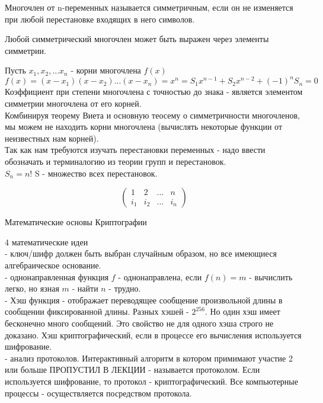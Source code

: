 \begin{defin}
	Многочлен от n-переменных называется симметричным, если он не изменяется при
 любой перестановке входящих в него символов.
\end{defin}

\begin{theorem}
	Любой симметрический многочлен может быть выражен через элементы симметрии.
\end{theorem}

\begin{theorem}[ Виета]
	Пусть $x_1, x_2, ... x_n$ - корни многочлена $f(x)$\\
	$f(x) = (x - x_1)(x - x_2) ... (x - x_n) = x^n = S_1 x^{n - 1} + S_2 x^{n - 2}
	+ (-1)^n S_n = 0$\\
	Коэффициент при степени многочлена с точностью до знака - является элементом
	симметрии многочлена от его корней.\\
	Комбинируя теорему Виета и основную теосему о симметричности многочленов, мы
	можем не находить корни многочлена (вычислять некоторые функции от неизвестных
	нам корней).\\
	Так как нам требуются изучать перестановки переменных - надо ввести обозначать
	и терминалогию из теории групп и перестановок.\\
	$S_n = n!$ S - множество всех перестановок.
\end{theorem}

\begin{displaymath}
\left( \begin{array}{lccr}
1 & 2 & ... & n \\
i_1 & i_2 & ... & i_n
\end{array}\right)
\end{displaymath}

\begin{title}
	Математические основы Криптографии
\end{title}

4 математические идеи\\

 - ключ/шифр должен быть выбран случайным образом, но все
имеющиеся алгебраическое основание.\\
 - однонаправленная функция $f$ - однонаправлена, если
$f(n) = m$ - вычислить легко, но язная $m$ - найти $n$ - трудно.\\
 - Хэш функция - отображает переводящее сообщение произвольной
длины в сообщении фиксированной длины. Разных хэшей - $2^256$. Но один хэш имеет
бесконечно много сообщений. Это свойство не для одного хэша  строго не доказано.
Хэш криптографический, если в процессе его вычисления используется шифрование.\\
 - анализ протоколов. Интерактивный алгоритм в котором
примимают участие 2 или больше ПРОПУСТИЛ В ЛЕКЦИИ - называется протоколом.
Если используется шифрование, то протокол - криптографический. Все компьютерные
процессы - осуществляется посредством протокола.